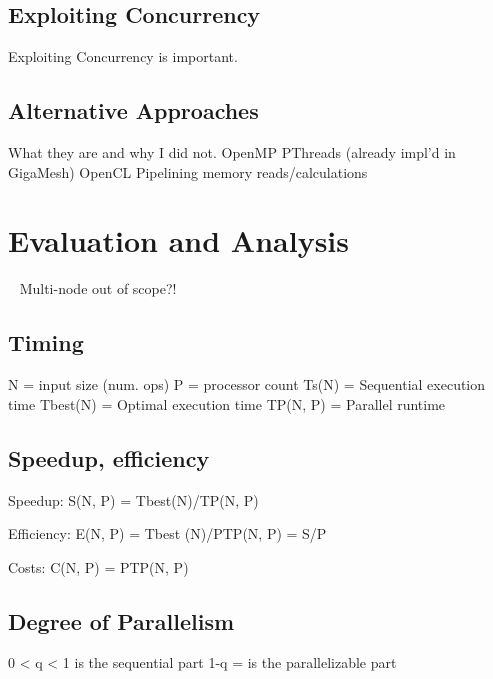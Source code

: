 \documentclass[openany]{book}
\begin{document}
\section{Exploiting Concurrency}
Exploiting Concurrency is important.


\section{Alternative Approaches}
What they are and why I did not.
OpenMP
PThreads
(already impl’d in GigaMesh)
OpenCL
Pipelining memory reads/calculations



\chapter{Evaluation and Analysis}~\cite[p.~330]{Lang17}
Multi-node out of scope?!



\section{Timing}
	N = input size (num. ops)
	P = processor count
	Ts(N) = Sequential execution time
	Tbest(N) = Optimal execution time
	TP(N, P) = Parallel runtime



\section{Speedup, efficiency}
	Speedup: 
S(N, P) = Tbest(N)/TP(N, P)

	Efficiency: 
E(N, P) = Tbest (N)/PTP(N, P) = S/P

	Costs: 
C(N, P) = PTP(N, P)



\section{Degree of Parallelism}
	0 < q < 1 is the sequential part
	1-q = is the parallelizable part
\end{document}
